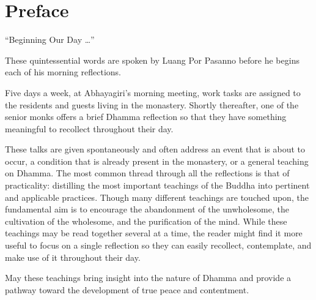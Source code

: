 \chapter{Preface}

``Beginning Our Day \ldots{}''

These quintessential words are spoken by Luang Por Pasanno before he
begins each of his morning reflections.

Five days a week, at Abhayagiri's morning meeting, work tasks are
assigned to the residents and guests living in the monastery. Shortly
thereafter, one of the senior monks offers a brief Dhamma reflection so
that they have something meaningful to recollect throughout their day. 

These talks are given spontaneously and often address an event that is
about to occur, a condition that is already present in the monastery, or
a general teaching on Dhamma. The most common thread through all the
reflections is that of practicality: distilling the most important
teachings of the Buddha into pertinent and applicable practices. Though
many different teachings are touched upon, the fundamental aim is to
encourage the abandonment of the unwholesome, the cultivation of the
wholesome, and the purification of the mind.
While these teachings may be read together several at a time, the reader
might find it more useful to focus on a single reflection so they can
easily recollect, contemplate, and make use of it throughout their day. 

May these teachings bring insight into the nature of Dhamma and provide
a pathway toward the development of true peace and contentment.

